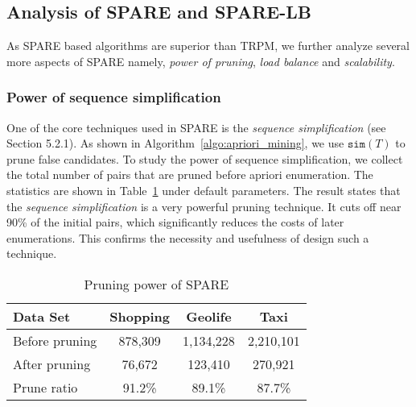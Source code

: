 


\subsection{Analysis of SPARE and SPARE-LB}
As SPARE based algorithms are superior than TRPM,
we further analyze several more aspects of SPARE namely, \emph{power of pruning}, \emph{load balance} and \emph{scalability}.

\subsubsection{Power of sequence simplification}
One of the core techniques used in SPARE is the \emph{sequence simplification} (see Section 5.2.1). 
As shown in  Algorithm~\ref{algo:apriori_mining}, we use $\mathtt{sim}(T)$
to prune false candidates. To study the power of sequence simplification,
we collect the total number of pairs that are pruned before apriori enumeration. The
statistics are shown in Table~\ref{tbl:pruning} under default parameters. The result states that the \emph{sequence simplification} is a very powerful pruning technique. It cuts off near 90\% of the initial pairs, which significantly reduces the costs
of later enumerations. This confirms the necessity and usefulness of design such a technique.


\begin{table}[h]
\begin{tabular}{|l|c|c|c|}
\hline 
\textbf{Data Set} & \textbf{Shopping} & \textbf{Geolife} & \textbf{Taxi} \\ 
\hline 
Before pruning & 878,309 &  1,134,228 & 2,210,101 \\ 
\hline 
After pruning & 76,672 & 123,410 & 270,921 \\ 
\hline 
Prune ratio & 91.2\% & 89.1\% & 87.7\% \\ 
\hline 
\end{tabular} 
%
\caption{Pruning power of SPARE}
\label{tbl:pruning}
\end{table}

